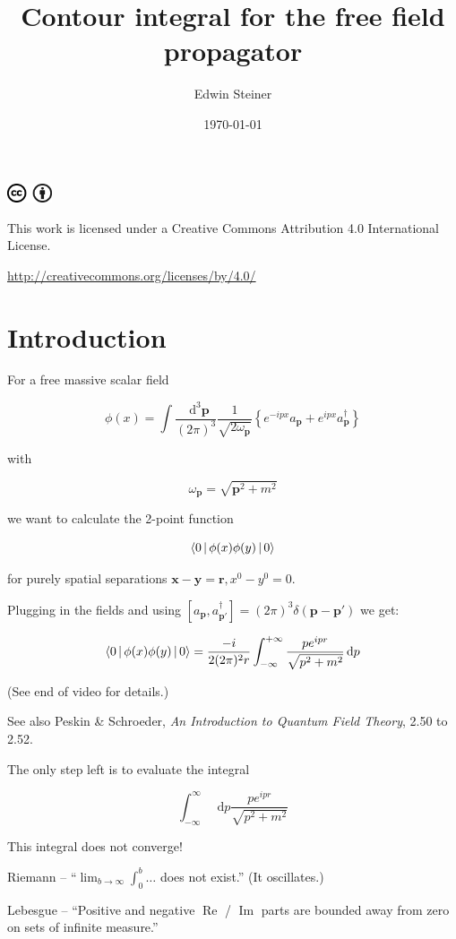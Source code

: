 \documentclass[aspectratio=169]{beamer}
\title{Contour integral for the free field propagator}
\author{Edwin Steiner}
\date{\today}
\newcommand{\sqrtpm}{\sqrt{p^2 + m^2}}
\newcommand{\integrand}{\frac{p e^{ipr}}{\sqrt{p^2 + m^2}}}
\newcommand{\vp}{\mathbf{p}}
\newcommand{\vx}{\mathbf{x}}
\newcommand{\vy}{\mathbf{y}}
\newcommand{\vr}{\mathbf{r}}
\newcommand{\vpp}{\mathbf{p}'}
\newcommand{\omvp}{\omega_{\vp}}
\newcommand{\ap}{a_{\vp}}
\newcommand{\adp}{a^\dagger_{\vp}}
\newcommand{\adpp}{a^\dagger_{\vpp}}
\newcommand{\diffop}{\mathop{}\!\mathrm{d}}
\newcommand{\dip}{\diffop p}
\newcommand{\intpthree}{\int \frac{\diffop^3\vp}{(2\pi)^3}}
\newcommand{\com}[2]{[{#1},{#2}]}
\newcommand{\phixy}{\Braket{0|\phi(x)\phi(y)|0}}
\newcommand{\intii}{\int_{-\infty}^{+\infty}}
\renewcommand\Re{\operatorname{Re}}
\renewcommand\Im{\operatorname{Im}}
\begin{document}

\begin{frame}
\titlepage
\begin{tiny}
\includegraphics[width=0.1\textwidth]{CC_BY.png}

\medskip
This work is licensed under a Creative Commons Attribution 4.0 International License.

\url{http://creativecommons.org/licenses/by/4.0/}
\end{tiny}
\end{frame}


\section{Introduction}


\begin{frame}
For a free massive \alert{scalar field}

\pause
$$\phi(x) = \intpthree \frac{1}{\sqrt{2\omvp}} \left\{ e^{-ipx} \ap + e^{ipx} \adp \right\}$$

with

$$\omvp = \sqrt{\vp^2 + m^2}$$

\pause
we want to calculate the \alert{2-point function}

\pause
$$\phixy$$

\pause
\medskip
for \alert{purely spatial} separations $\vx - \vy = \vr, x^0 - y^0 = 0$.
\end{frame}


\begin{frame}
Plugging in the fields and using $\com{\ap}{\adpp} = (2\pi)^3 \delta(\vp - \vpp)$ we get:

\pause
$$\phixy = \frac{-i}{2(2\pi)^2 r} \intii \frac{p e^{ipr}}{\sqrtpm} \dip$$

\pause
\bigskip
(See end of video for details.)

\pause
\medskip
See also Peskin \& Schroeder, \textit{An Introduction to Quantum Field Theory}, 2.50 to 2.52.
\end{frame}


\begin{frame}
The only step left is to evaluate the integral

$$\int_{-\infty}^{\infty} \dip \integrand$$

\pause
\medskip
\alert{This integral does not converge!}

\pause
\bigskip
\bigskip
Riemann -- ``$\lim_{b \to \infty} \int_0^b \ldots$ does not exist.'' (It oscillates.)

\pause
\bigskip
Lebesgue -- ``Positive and negative $\Re$ / $\Im$ parts are bounded away from zero on sets of infinite measure.''
\end{frame}
\end{document}
